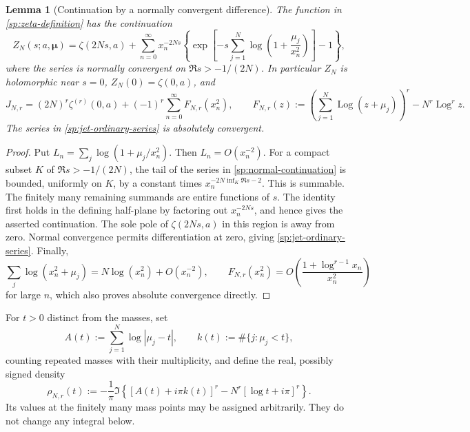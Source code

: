 \documentclass[11pt,letterpaper]{article}
\numberwithin{equation}{section}
\newtheorem{lemma}[theorem]{Lemma}
\theoremstyle{definition}
\theoremstyle{remark}
\DeclareMathOperator{\Log}{Log}
\begin{document}
\begin{lemma}[Continuation by a normally convergent difference]
\label{sp:continuation}
The function in \eqref{sp:zeta-definition} has the continuation
\begin{equation}
 Z_N(s;a,\boldsymbol\mu)
 =\zeta(2Ns,a)+
 \sum_{n=0}^{\infty}x_n^{-2Ns}
 \left\{\exp\left[-s\sum_{j=1}^{N}
             \log\left(1+\frac{\mu_j}{x_n^2}\right)\right]-1\right\},
 \label{sp:normal-continuation}
\end{equation}
where the series is normally convergent on $\Re s>-1/(2N)$.
In particular $Z_N$ is holomorphic near $s=0$, $Z_N(0)=\zeta(0,a)$,
and
\begin{equation}
 J_{N,r}=(2N)^r\zeta^{(r)}(0,a)
          +(-1)^r\sum_{n=0}^{\infty}F_{N,r}(x_n^2),
 \qquad
 F_{N,r}(z):=
 \left(\sum_{j=1}^{N}\Log(z+\mu_j)\right)^r-N^r\Log^r z.
 \label{sp:jet-ordinary-series}
\end{equation}
The series in \eqref{sp:jet-ordinary-series} is absolutely convergent.
\end{lemma}

\begin{proof}
Put $L_n=\sum_j\log(1+\mu_j/x_n^2)$.  Then $L_n=O(x_n^{-2})$.
For a compact subset $K$ of $\Re s>-1/(2N)$, the tail of the
series in \eqref{sp:normal-continuation} is bounded, uniformly on $K$,
by a constant times $x_n^{-2N\inf_K\Re s-2}$.  This is summable.
The finitely many remaining summands are entire functions of $s$.
The identity first holds in the defining half-plane by factoring
out $x_n^{-2Ns}$, and hence gives the asserted continuation.
The sole pole of $\zeta(2Ns,a)$ in this region is away from zero.
Normal convergence permits differentiation at zero, giving
\eqref{sp:jet-ordinary-series}.  Finally,
\[
 \sum_j\log(x_n^2+\mu_j)=N\log(x_n^2)+O(x_n^{-2}),
 \qquad
 F_{N,r}(x_n^2)=O\left(\frac{1+\log^{r-1}x_n}{x_n^2}\right)
\]
for large $n$, which also proves absolute convergence directly.
\end{proof}

For $t>0$ distinct from the masses, set
\begin{equation}
 A(t):=\sum_{j=1}^{N}\log|\mu_j-t|,
 \qquad k(t):=\#\{j:\mu_j<t\},
 \label{sp:cut-data}
\end{equation}
counting repeated masses with their multiplicity, and define the
real, possibly signed density
\begin{equation}
 \rho_{N,r}(t):=-\frac{1}{\pi}\Im\left\{
        [A(t)+i\pi k(t)]^r
           -N^r[\log t+i\pi]^r\right\}.
 \label{sp:scalar-density}
\end{equation}
Its values at the finitely many mass points may be assigned
arbitrarily.  They do not change any integral below.
\end{document}
